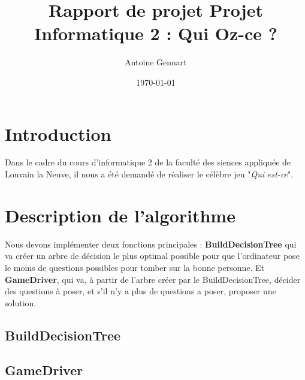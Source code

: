 \documentclass[10pt,a4paper]{article}
\author{Antoine Gennart}
\title{Rapport de projet \newline  Projet Informatique 2 : Qui Oz-ce ?}
\date{\today}
\begin{document}
\maketitle

\tableofcontents

\section*{Introduction}
Dans le cadre du cours d'informatique 2 de la faculté des siences appliquée de Louvain la Neuve, il nous a été demandé de réaliser le célèbre jeu "\textit{Qui est-ce}".

\section{Description de l'algorithme}
Nous devons implémenter deux fonctions principales : \textbf{BuildDecisionTree} qui va créer un arbre de décision le plus optimal possible pour que l'ordinateur pose le moins de questions possibles pour tomber sur la bonne personne. Et \textbf{GameDriver}, qui va, à partir de l'arbre créer par le BuildDecisionTree, décider des questions à poser, et s'il n'y a plus de questions a poser, proposer une solution.

\subsection{BuildDecisionTree}


\subsection{GameDriver}
\end{document}
